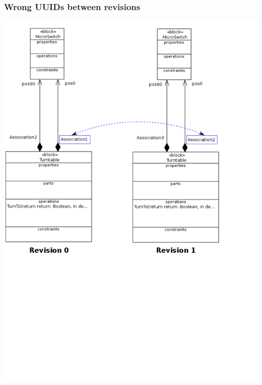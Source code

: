 \documentclass[10pt]{beamer}
\begin{document}
\begin{frame}
\frametitle{Wrong UUIDs between revisions}
\begin{center}
\includegraphics[scale=0.33]{wrongUUIDs_examples_p4}\\
\end{center}

\end{frame}
\end{document}
